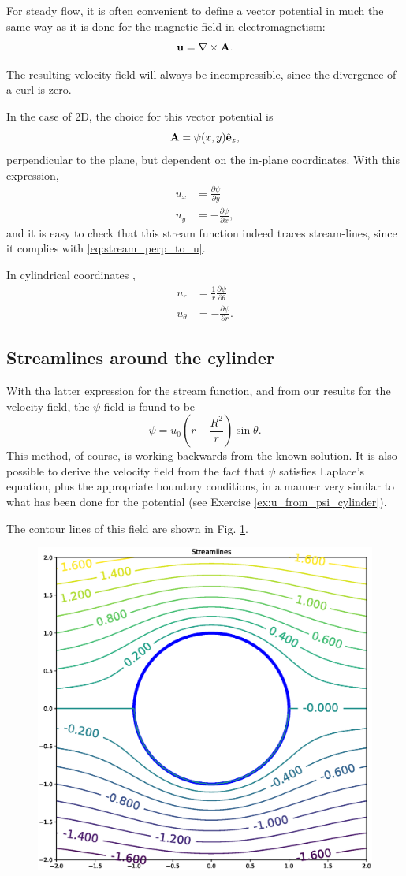 For steady flow, it is often convenient to define a vector potential
 in much the same way as it is done for the
magnetic field in electromagnetism:
\begin{equation}
  \label{eq:vector_potential}
  \mathbf{u} = \nabla\times \mathbf{A} .
\end{equation}

The resulting velocity field will always be incompressible, since the
divergence of a curl is zero.

In the case of 2D, the choice for this vector potential is
\begin{equation}
  \label{eq:A_psi_2D}
  \mathbf{A} = \psi(x,y) \hat{\mathbf{e}}_z ,    
\end{equation}
perpendicular to the plane, but dependent on the in-plane
coordinates. With this expression,
\begin{align*}
  u_x &=  \frac{\partial \psi}{\partial y} \\
  u_y &= -\frac{\partial \psi}{\partial x} ,
\end{align*}
and it is easy to check that this stream function indeed traces
stream-lines, since it complies with \ref{eq:stream_perp_to_u}.

In cylindrical coordinates \cite{wiki:del},
\begin{align*}
u_r &= \frac1r \frac{\partial \psi}{\partial \theta} \\
u_\theta &=   - \frac{\partial \psi}{\partial r} .
\end{align*}


\subsection{Streamlines around the cylinder}

With tha latter expression for the stream function, and from our
results for the velocity field, the $\psi$ field is found to be
\[
\psi = u_0 \left( r-{\frac {R^{2}}{r}}\right)\sin \theta .
\]
This method, of course, is working backwards from the known
solution. It is also possible to derive the velocity field from the
fact that $\psi$ satisfies Laplace's equation, plus the appropriate
boundary conditions, in a manner very similar to what has been done
for the potential (see Exercise \ref{ex:u_from_psi_cylinder}).

The contour lines of this field are shown in
Fig. \ref{fig:potential_flow_past_cylinder}.

\begin{figure}
  \centering
  \includegraphics[width=0.4\linewidth]{figures/potential_flow_past_cylinder}
  \caption{\label{fig:potential_flow_past_cylinder}}
\end{figure}

